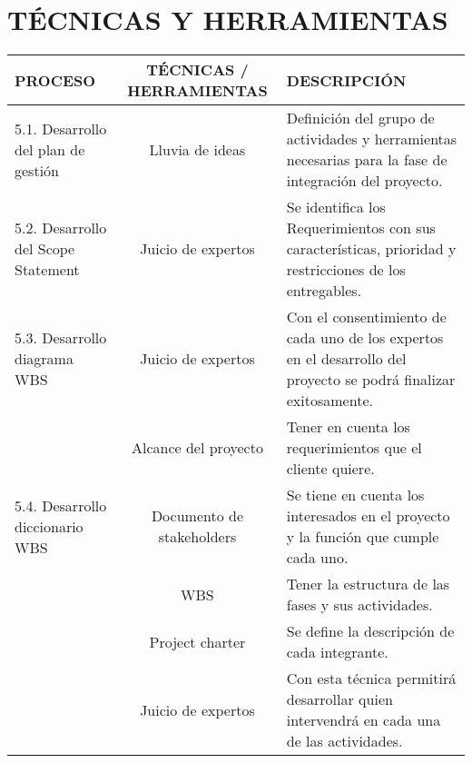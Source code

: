 \chapter{T\'ECNICAS Y HERRAMIENTAS}
%
\begin{table}[H]
	\centering
	\begin{tabular}{| m{5cm} | c | p{5cm} |}
	\hline
	\rowcolor{LightGrey}
	\textbf{PROCESO} & \textbf{T\'ECNICAS / HERRAMIENTAS} & \textbf{DESCRIPCI\'ON} \\ \hline
	5.1. Desarrollo del plan de gesti\'on & Lluvia de ideas & Definici\'on del grupo de actividades y herramientas 
	necesarias para la fase de integraci\'on del proyecto.\\
	\hline
	5.2. Desarrollo del Scope Statement & Juicio de expertos & Se identifica los Requerimientos con sus 
	 caracter\'isticas, prioridad y restricciones de los entregables. \\
	\hline
	5.3. Desarrollo diagrama WBS & Juicio de expertos & Con el consentimiento  de cada uno de los expertos en el 
	desarrollo del proyecto  se podr\'a finalizar exitosamente.\\
	\cline{2-3}
	& Alcance del proyecto & Tener en cuenta  los  requerimientos que el cliente quiere.\\
	\hline
	5.4. Desarrollo diccionario WBS & Documento de stakeholders & Se tiene en cuenta los interesados en el proyecto 
	y la funci\'on que cumple cada uno.\\
	\cline{2-3}
	& WBS & Tener la estructura de las fases y sus actividades.\\
	\cline{2-3}
	& Project charter & Se define la descripci\'on de cada integrante.\\
	\cline{2-3}
	& Juicio de expertos & Con esta t\'ecnica permitir\'a desarrollar quien intervendr\'a en cada una de las 
	actividades.\\
	\hline
	\end{tabular}
	
\end{table}
